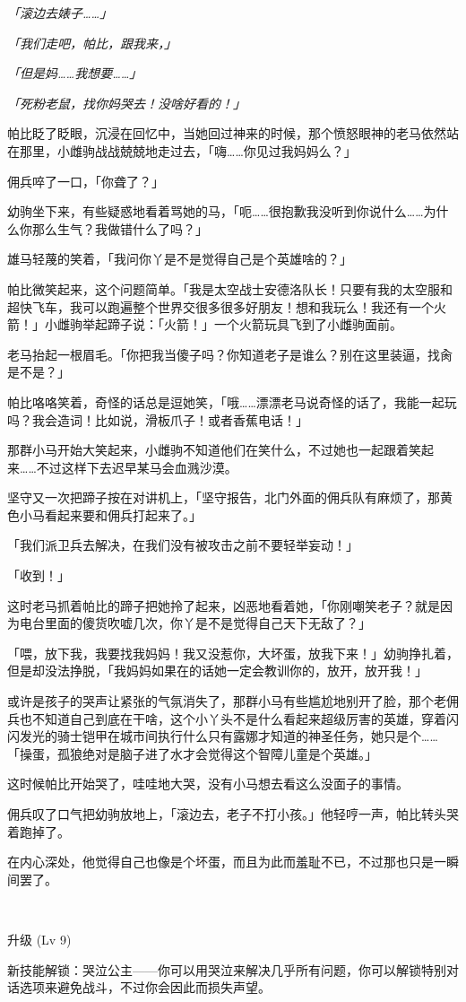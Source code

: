 \emph{「滚边去婊子……」}

\emph{「我们走吧，帕比，跟我来，」}

\emph{「但是妈……我想要……」}

\emph{「死粉老鼠，找你妈哭去！没啥好看的！」}

帕比眨了眨眼，沉浸在回忆中，当她回过神来的时候，那个愤怒眼神的老马依然站在那里，小雌驹战战兢兢地走过去，「嗨……你见过我妈妈么？」

佣兵啐了一口，「你聋了？」

幼驹坐下来，有些疑惑地看着骂她的马，「呃……很抱歉我没听到你说什么……为什么你那么生气？我做错什么了吗？」

雄马轻蔑的笑着，「我问你丫是不是觉得自己是个英雄啥的？」

帕比微笑起来，这个问题简单。「我是太空战士安德洛队长！只要有我的太空服和超快飞车，我可以跑遍整个世界交很多很多好朋友！想和我玩么！我还有一个火箭！」小雌驹举起蹄子说：「火箭！」一个火箭玩具飞到了小雌驹面前。

老马抬起一根眉毛。「你把我当傻子吗？你知道老子是谁么？别在这里装逼，找肏是不是？」

帕比咯咯笑着，奇怪的话总是逗她笑，「哦……漂漂老马说奇怪的话了，我能一起玩吗？我会造词！比如说，滑板爪子！或者香蕉电话！」

那群小马开始大笑起来，小雌驹不知道他们在笑什么，不过她也一起跟着笑起来……不过这样下去迟早某马会血溅沙漠。

坚守又一次把蹄子按在对讲机上，「坚守报告，北门外面的佣兵队有麻烦了，那黄色小马看起来要和佣兵打起来了。」

「我们派卫兵去解决，在我们没有被攻击之前不要轻举妄动！」

「收到！」

这时老马抓着帕比的蹄子把她拎了起来，凶恶地看着她，「你刚嘲笑老子？就是因为电台里面的傻货吹嘘几次，你丫是不是觉得自己天下无敌了？」

「喂，放下我，我要找我妈妈！我又没惹你，大坏蛋，放我下来！」幼驹挣扎着，但是却没法挣脱，「我妈妈如果在的话她一定会教训你的，放开，放开我！」

或许是孩子的哭声让紧张的气氛消失了，那群小马有些尴尬地别开了脸，那个老佣兵也不知道自己到底在干啥，这个小丫头不是什么看起来超级厉害的英雄，穿着闪闪发光的骑士铠甲在城市间执行什么只有露娜才知道的神圣任务，她只是个……「操蛋，孤狼绝对是脑子进了水才会觉得这个智障儿童是个英雄。」

这时候帕比开始哭了，哇哇地大哭，没有小马想去看这么没面子的事情。

佣兵叹了口气把幼驹放地上，「滚边去，老子不打小孩。」他轻哼一声，帕比转头哭着跑掉了。

在内心深处，他觉得自己也像是个坏蛋，而且为此而羞耻不已，不过那也只是一瞬间罢了。

~\vfill

\begin{note}
升级 (Lv 9) 

新技能解锁：哭泣公主——你可以用哭泣来解决几乎所有问题，你可以解锁特别对话选项来避免战斗，不过你会因此而损失声望。
\end{note}



